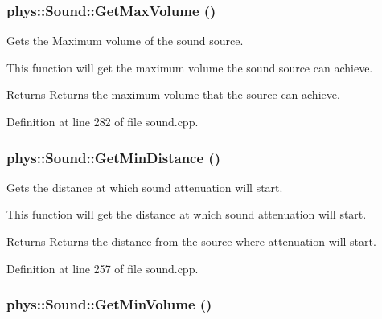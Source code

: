 \hypertarget{classphys_1_1Sound_aebda862caeda83fed2789f1e8bfca7ea}{
\subsubsection[{GetMaxVolume}]{ phys::Sound::GetMaxVolume ()}}
\label{dc/d2f/classphys_1_1Sound_aebda862caeda83fed2789f1e8bfca7ea}


Gets the Maximum volume of the sound source. 

This function will get the maximum volume the sound source can achieve. \begin{DoxyReturn}{Returns}
Returns the maximum volume that the source can achieve. 
\end{DoxyReturn}


Definition at line 282 of file sound.cpp.

\hypertarget{classphys_1_1Sound_a45534a33db7c3aec3861b44327925bc2}{
\subsubsection[{GetMinDistance}]{ phys::Sound::GetMinDistance ()}}
\label{dc/d2f/classphys_1_1Sound_a45534a33db7c3aec3861b44327925bc2}


Gets the distance at which sound attenuation will start. 

This function will get the distance at which sound attenuation will start. \begin{DoxyReturn}{Returns}
Returns the distance from the source where attenuation will start. 
\end{DoxyReturn}


Definition at line 257 of file sound.cpp.

\hypertarget{classphys_1_1Sound_a366c57366bbbfc13eea18e1908f19eb4}{
\subsubsection[{GetMinVolume}]{ phys::Sound::GetMinVolume ()}}
\label{dc/d2f/classphys_1_1Sound_a366c57366bbbfc13eea18e1908f19eb4}


